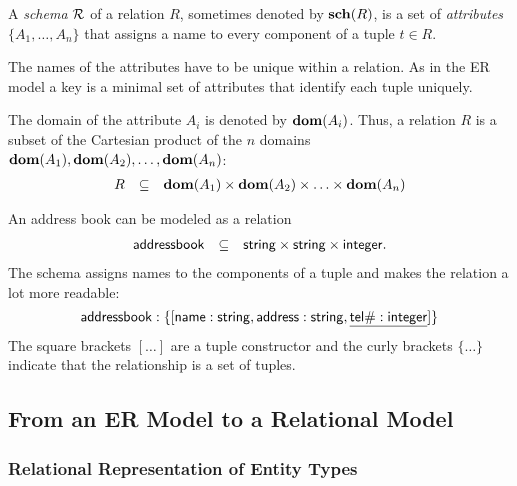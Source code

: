 A \emph{schema} $\mathcal{R}$ of a relation $R$, sometimes denoted by $\mathbf{sch}(R)$, is a set of \emph{attributes} $\{A_1, \ldots, A_n\}$ that assigns a name to every component of a tuple $t \in R$.

The names of the attributes have to be unique within a relation. As in the ER model a key is a minimal set of attributes that identify each tuple uniquely.

The domain of the attribute $A_i$ is denoted by $\mathbf{dom}(A_i)$. Thus, a relation $R$ is a subset of the Cartesian product of the $n$ domains $\mathbf{dom}(A_1), \mathbf{dom}(A_2), \ldots, \mathbf{dom}(A_n)$:
\[ \begin{array}{rcl}
R & \subseteq & \mathbf{dom}(A_1) \times \mathbf{dom}(A_2) \times \ldots \times \mathbf{dom}(A_n)
\end{array} \]


\begin{example} An address book can be modeled as a relation
\[ \begin{array}{rcl}
\mathsf{addressbook} & \subseteq & \mathsf{string \times string \times integer}.
\end{array}\]
The schema assigns names to the components of a tuple and makes the relation a lot more readable:
\[
\mathsf{addressbook : \{ [ name:string, address:string, \underline{tel\#:integer}] \}}
\]
The square brackets $[\ldots]$ are a tuple constructor and the curly brackets $\{\ldots\}$ indicate that the relationship is a set of tuples.
\end{example}




\subsection{From an ER Model to a Relational Model}




\subsubsection[Representation of Entity Types]{Relational Representation of Entity Types}

